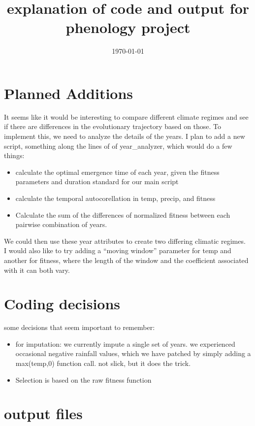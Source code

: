 \documentclass[11pt,a4paper]{article}
\title{explanation of code and output for phenology project}
\author{}
\date{\today}
\begin{document}
\maketitle
\section{Planned Additions}
It seems like it would be interesting to compare different climate regimes and see if there are differences in the evolutionary trajectory based on those. To implement this, we need to analyze the details of the years. I plan to add a new script, something along the lines of of year\_analyzer, which would do a few things:
\begin{itemize}
	\item calculate the optimal emergence time of each year, given the fitness parameters and duration standard for our main script
	\item calculate the temporal autocorellation in temp, precip, and fitness
	\item Calculate the sum of the differences of normalized fitness between each pairwise combination of years.
\end{itemize}
We could then use these year attributes to create two differing climatic regimes.\\
I would also like to try adding a ``moving window'' parameter for temp and another for fitness, where the length of the window and the coefficient associated with it can both vary.

\section{Coding decisions}
some decisions that seem important to remember:
\begin{itemize}
	\item for imputation: we currently impute a single set of years. we experienced occasional negative rainfall values, which we have patched by simply adding a max(temp,0) function call. not slick, but it does the trick. 
	\item Selection is based on the raw fitness function
\end{itemize}

\section{output files}
\end{document}
